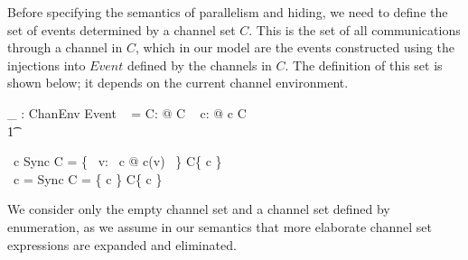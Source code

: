 \documentclass{article}
\begin{document}
Before specifying the semantics of parallelism and hiding, we need to
define the set of events determined by a channel set $C$.  This is the
set of all communications through a channel in $C$, which in our model
are the events constructed using the injections into $Event$ defined
by the channels in $C$.  The definition of this set is shown below; it
depends on the current channel environment.
\begin{zed}
  \lbag \_ \rbag:  \pfun ChanEnv \pfun \power
  Event
  \also %
  \lbag \lchanset ~ \rchanset \rbag\gamma = \emptyset
  \also %
  \forall C:  @ C \neq \lchanset ~ \rchanset
  \implies \exists c:  @ c \in C \land {}
  \\ %
  \t1
  \begin{block}
    \gamma\ c \neq Sync \implies \lbag C \rbag\gamma = \{~ v: \gamma\ c
    @ c(v) ~\} \cup \lbag C\setminus \{ c \} \rbag\gamma \land {}
    \\ %
    \gamma\ c = Sync \implies \lbag C \rbag\gamma = \{ c \} \cup \lbag
    C\setminus \{ c \} \rbag\gamma
  \end{block}
\end{zed}
We consider only the empty channel set and a channel set defined by
enumeration, as we assume in our semantics that more elaborate channel
set expressions are expanded and eliminated.
\end{document}
